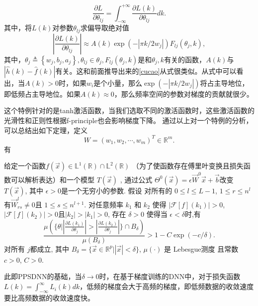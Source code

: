 \begin{equation}
    \frac{\partial L}{\partial\theta_{lj}}=\int_{-\infty}^{+\infty}\frac{\partial L(k)}{\partial\theta_{lj}}dk.\label{eq:GDfreq}
\end{equation}
其中，将$L(k)$对参数$\theta_{lj}$求偏导取绝对值
\begin{equation}
    \left|\frac{\partial L(k)}{\partial\theta_{lj}}\right|\approx A(k)\exp\left(-|\pi k/2w_{j}|\right)F_{lj}(\theta_{j},k),\label{eq:DL2}
\end{equation}
其中，$\theta_{j} \triangleq\left\{w_{j}, b_{j}, a_{j}\right\}, \theta_{l j} \in \theta_{j}, F_{l j}\left(\theta_{j}, k\right)$是和$\theta_{j}, k$有关的函数，$A(k)$与$|\hat{h}(k)-\hat{f}(k)|$有关。这和前面推导出来的\ref{cucao}从式很类似。从式中可以看出，当$A(k)>0$时，如果$w_{i}$是个小量，那么$\exp\left(-|\pi k/2w_{j}|\right)$将占主导地位，即低频占主导地位。如果$A(k)\approx 0$，那么频率空间的参数对梯度的贡献就很少。

这个特例针对的是tanh激活函数，当我们选取不同的激活函数时，这些激活函数的光滑性和正则性根据f-principle也会影响梯度下降。
通过以上对一个特例的分析，可以总结出如下定理，定义
\begin{equation}
    W=\left(w_{1}, w_{2}, \cdots, w_{m}\right)^{T} \in \mathbb{R}^{m}.
\end{equation}
有
\begin{thm}
给定一个函数$f(\vec{x})\in\mathbb{L}^{1}(\mathbb{R})\cap\mathbb{L}%
^{2}(\mathbb{R})$ （为了使函数存在傅里叶变换且损失函数可以解析表达）和一个模型 $T(\vec{x})$ , 通过公式 $\Theta^{0}(\vec{x})=\epsilon
\vec{W}^{0}\vec{x}+\vec{b}$改变 $T(\vec{x})$, 其中 $\epsilon>0$是一个无穷小的参数. 假设
 对所有的 $0\leqslant l\leqslant L-1$, $1\leqslant
r\leqslant n^{l}$ 有$\vec{W}_{rs}^{l}\neq0$且 $1\leqslant s\leqslant n^{l+1}$. 对任意频率  
$k_{1}$ 和 $k_{2}$ 使得 $\left|  \mathcal{F}[f](k_{1}) \right|  >0$,
$\left|  \mathcal{F}[f](k_{2}) \right|  >0$且$\left|  k_{2} \right|
>\left|  k_{1} \right|  >0$, 存在 $\delta>0$ 使得当
$\epsilon<\delta$时,有
\[
\frac{\mu\left(  \{\theta|\left|  \frac{\partial L(k_{1})}{\partial\theta_{j}}
\right|  >\left|  \frac{\partial L(k_{2})}{\partial\theta_{j}} \right|  \}\cap
B_{\delta}\right)  }{\mu(B_{\delta})}>1-C\exp(-c/\delta).
\]
对所有 $j$都成立, 其中 $B_{\delta}=\{\vec{x}\in\mathbb{R}^{p}|\left|
\vec{x} \right|  <\delta\}$, $\mu(\cdot)$ 是 Lebesgue测度 且常数 $c>0$,
$C>0$.
\end{thm}

此即PPSDNN的基础，当$\delta \rightarrow 0$时，在基于梯度训练的DNN中，对于损失函数$L(k) = \int_{-\infty }^{\infty } L_i(k)dk$，低频的梯度会大于高频的梯度，即低频数据的收敛速度要比高频数据的收敛速度快。

